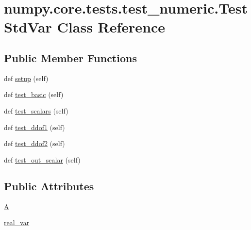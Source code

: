 \hypertarget{classnumpy_1_1core_1_1tests_1_1test__numeric_1_1TestStdVar}{}\section{numpy.\+core.\+tests.\+test\+\_\+numeric.\+Test\+Std\+Var Class Reference}
\label{classnumpy_1_1core_1_1tests_1_1test__numeric_1_1TestStdVar}
\subsection*{Public Member Functions}
\begin{DoxyCompactItemize}
\item 
def \hyperlink{classnumpy_1_1core_1_1tests_1_1test__numeric_1_1TestStdVar_a741075f21e9be614d38f94d171e46d77}{setup} (self)
\item 
def \hyperlink{classnumpy_1_1core_1_1tests_1_1test__numeric_1_1TestStdVar_a4a4e4a978dd642ae5942e65a9a676e9d}{test\+\_\+basic} (self)
\item 
def \hyperlink{classnumpy_1_1core_1_1tests_1_1test__numeric_1_1TestStdVar_a94dedcf2ea13d0e3b8fc15f49084f99f}{test\+\_\+scalars} (self)
\item 
def \hyperlink{classnumpy_1_1core_1_1tests_1_1test__numeric_1_1TestStdVar_a905d6e4dc5a3eb9384f6799d5bb8de90}{test\+\_\+ddof1} (self)
\item 
def \hyperlink{classnumpy_1_1core_1_1tests_1_1test__numeric_1_1TestStdVar_aed0f6dcb0bcde5f18236c699cbb044cf}{test\+\_\+ddof2} (self)
\item 
def \hyperlink{classnumpy_1_1core_1_1tests_1_1test__numeric_1_1TestStdVar_ae99dc6f9d6cfd30298ec1fccca3978e9}{test\+\_\+out\+\_\+scalar} (self)
\end{DoxyCompactItemize}
\subsection*{Public Attributes}
\begin{DoxyCompactItemize}
\item 
\hyperlink{classnumpy_1_1core_1_1tests_1_1test__numeric_1_1TestStdVar_ad8dd73e0052dd66168820c63b5040b06}{A}
\item 
\hyperlink{classnumpy_1_1core_1_1tests_1_1test__numeric_1_1TestStdVar_a32c48bef3a2017004fa9574559ddcde4}{real\+\_\+var}
\end{DoxyCompactItemize}


